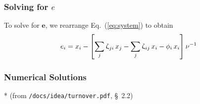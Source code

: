 \documentclass{article}
\numberwithin{equation}{section}
\newcommand{\eq}[1]{Eq.~(\ref{#1})}
\renewcommand{\zeta}{\upzeta}
\begin{document}
\subsubsection{Solving for $e$}
To solve for $\bm{e}$, we rearrange \eq{eq:system} to obtain
\begin{equation}\label{eq:system-e}
e_i = x_i - \left[ \sum_{j}{\zeta_{ji} \thinspace x_j}
                 - \sum_{j}{\zeta_{ij} \thinspace x_i}
                 - \phi_i \thinspace x_i \right] \nu^{-1}
\end{equation}
\subsubsection{Numerical Solutions}
* (from \texttt{/docs/idea/turnover.pdf}, \S~2.2)
\end{document}
